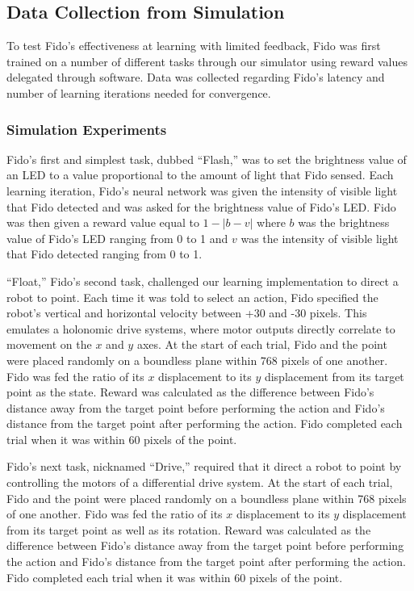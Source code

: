 \subsection{Data Collection from Simulation}

To test Fido's effectiveness at learning with limited feedback, Fido was first trained on a number of different tasks through our simulator using reward values delegated through software.
Data was collected regarding Fido's latency and number of learning iterations needed for convergence.

\subsubsection{Simulation Experiments}

Fido's first and simplest task, dubbed ``Flash,'' was to set the brightness value of an LED to a value proportional to the amount of light that Fido sensed.
Each learning iteration, Fido's neural network was given the intensity of visible light that Fido detected and was asked for the brightness value of Fido's LED.
Fido was then given a reward value equal to $1 - |b - v|$ where $b$ was the brightness value of Fido's LED ranging from 0 to 1 and $v$ was the intensity of visible light that Fido detected ranging from 0 to 1.

``Float,'' Fido's second task, challenged our learning implementation to direct a robot to point.
Each time it was told to select an action, Fido specified the robot's vertical and horizontal velocity between +30 and -30 pixels.
This emulates a holonomic drive systems, where motor outputs directly correlate to movement on the $x$ and $y$ axes.
At the start of each trial, Fido and the point were placed randomly on a boundless plane within 768 pixels of one another.
Fido was fed the ratio of its $x$ displacement to its $y$ displacement from its target point as the state.
Reward was calculated as the difference between Fido's distance away from the target point before performing the action and Fido's distance from the target point after performing the action.
Fido completed each trial when it was within 60 pixels of the point.

Fido's next task, nicknamed ``Drive,'' required that it direct a robot to point by controlling the motors of a differential drive system.
At the start of each trial, Fido and the point were placed randomly on a boundless plane within 768 pixels of one another.
Fido was fed the ratio of its $x$ displacement to its $y$ displacement from its target point as well as its rotation.
Reward was calculated as the difference between Fido's distance away from the target point before performing the action and Fido's distance from the target point after performing the action.
Fido completed each trial when it was within 60 pixels of the point.

